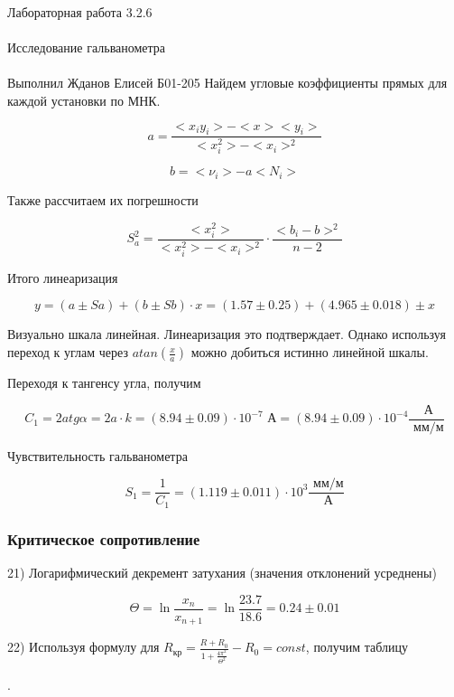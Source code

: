 \documentclass{astroedu-lab}
\begin{document}
\begin{problem}{\huge Лабораторная работа 3.2.6\\\\Исследование гальванометра\\\\Выполнил Жданов Елисей Б01-205}
Найдем угловые коэффициенты прямых для каждой установки по МНК.

\[
	a = \frac{<x_i y_i> - < x > < y_i >}{< x_i^2> - < x_i >^2}
\]

\[
	b = < \nu_i > - a < N_i >
\]

Также рассчитаем их погрешности

\begin{equation}
	S_a^2 = \frac{< x_i^2>}{< x_i^2 > - < x_i >^2} \cdot \frac{<  b_i - b > ^2}{n - 2}
\end{equation}

Итого линеаризация

\begin{equation}
	y = (a \pm Sa) + (b \pm Sb) \cdot x = (1.57 \pm 0.25) + (4.965 \pm 0.018) \pm x
\end{equation}

Визуально шкала линейная. Линеаризация это подтверждает. Однако используя переход к углам через $	atan \left( \frac{x}{a} \right)$ можно добиться истинно линейной шкалы.

Переходя к тангенсу угла, получим

\begin{equation}
	C_1 = 2 a tg \alpha = 2 a \cdot k = (8.94 \pm 0.09) \cdot 10^{-7} \text{ А} = (8.94 \pm 0.09) \cdot 10^{-4} \frac{\text{ А}}{\text{ мм/м}}
\end{equation}

Чувствительность гальванометра

\begin{equation}
	S_1 = \frac{1}{C_1} = (1.119 \pm 0.011) \cdot 10^{3} \frac{\text{ мм/м}}{\text{ А}}
\end{equation}

\subsubsection{Критическое сопротивление}

21) Логарифмический декремент затухания (значения отклонений усреднены)

$$
\Theta=\ln \frac{x_n}{x_{n+1}} = \ln \frac{23.7}{18.6} = 0.24 \pm 0.01
$$

22) Используя формулу для $R_\text{кр} = \frac{R+R_0}{1+\frac{4\pi^2}{\Theta^2}} - R_0 = const$, получим таблицу


.


\end{problem}
\end{document}
